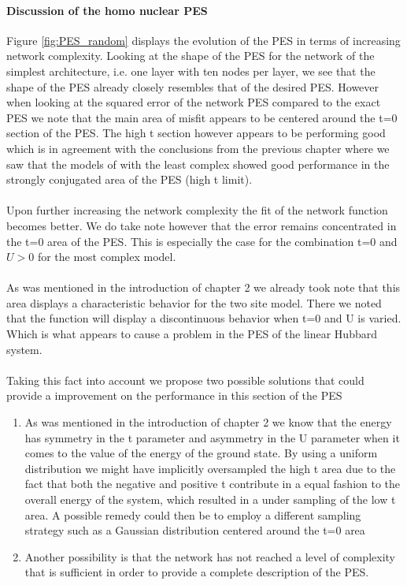 \documentclass[12pt]{article}
\begin{document}
\paragraph{Discussion of the homo nuclear PES}
Figure \ref{fig:PES_random} displays the evolution of the PES in terms of increasing network complexity. Looking at the shape of the PES for the network of the simplest architecture, i.e. one layer with ten nodes per layer, we see that the shape of the PES already closely resembles that of the desired PES. However when looking at the squared error of the network PES compared to the exact PES we note that the main area of misfit appears to be centered around the t=0 section of the PES. The high t section however appears to be performing good which is in agreement with the conclusions from the previous chapter where we saw that the models of with the least complex showed good performance in the strongly conjugated area of the PES (high t limit).
\\
\\
Upon further increasing the network complexity the fit of the network function becomes better. We do take note however that the error remains concentrated in the t=0 area of the PES. This is especially the case for the combination t=0 and $U>0$ for the most complex model.
\\
\\
As was mentioned in the introduction of chapter 2 we already took note that this area displays a characteristic behavior for the two site model. There we noted that the function will display a discontinuous behavior when t=0 and U is varied. Which is what appears to cause a problem in the PES of the linear Hubbard system.
\\
\\
Taking this fact into account we propose two possible solutions that could provide a improvement on the performance in this section of the PES
\begin{enumerate}
	\item As was mentioned in the introduction of chapter 2 we know that the energy has symmetry in the t parameter and asymmetry in the U parameter when it comes to the value of the energy of the ground state. By using a uniform distribution we might have implicitly oversampled the high t area due to the fact that both the negative and positive t contribute in a equal fashion to the overall energy of the system, which resulted in a under sampling of the low t area. A possible remedy could then be to employ a different sampling strategy such as a Gaussian distribution centered around the t=0 area
	\item Another possibility is that the network has not reached a level of complexity that is sufficient in order to provide a complete description of the PES. 
\end{enumerate}
\end{document}

